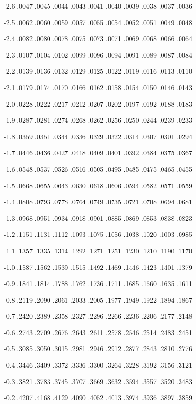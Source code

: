 \documentclass[12pt,fleqn]{article}\usepackage{../../common}
\begin{document}
-2.6 .0047 .0045 .0044 .0043 .0041 .0040 .0039 .0038 .0037 .0036

-2.5 .0062 .0060 .0059 .0057 .0055 .0054 .0052 .0051 .0049 .0048

-2.4 .0082 .0080 .0078 .0075 .0073 .0071 .0069 .0068 .0066 .0064

-2.3 .0107 .0104 .0102 .0099 .0096 .0094 .0091 .0089 .0087 .0084

-2.2 .0139 .0136 .0132 .0129 .0125 .0122 .0119 .0116 .0113 .0110

-2.1 .0179 .0174 .0170 .0166 .0162 .0158 .0154 .0150 .0146 .0143

-2.0 .0228 .0222 .0217 .0212 .0207 .0202 .0197 .0192 .0188 .0183

-1.9 .0287 .0281 .0274 .0268 .0262 .0256 .0250 .0244 .0239 .0233

-1.8 .0359 .0351 .0344 .0336 .0329 .0322 .0314 .0307 .0301 .0294

-1.7 .0446 .0436 .0427 .0418 .0409 .0401 .0392 .0384 .0375 .0367

-1.6 .0548 .0537 .0526 .0516 .0505 .0495 .0485 .0475 .0465 .0455

-1.5 .0668 .0655 .0643 .0630 .0618 .0606 .0594 .0582 .0571 .0559

-1.4 .0808 .0793 .0778 .0764 .0749 .0735 .0721 .0708 .0694 .0681

-1.3 .0968 .0951 .0934 .0918 .0901 .0885 .0869 .0853 .0838 .0823

-1.2 .1151 .1131 .1112 .1093 .1075 .1056 .1038 .1020 .1003 .0985

-1.1 .1357 .1335 .1314 .1292 .1271 .1251 .1230 .1210 .1190 .1170

-1.0 .1587 .1562 .1539 .1515 .1492 .1469 .1446 .1423 .1401 .1379

-0.9 .1841 .1814 .1788 .1762 .1736 .1711 .1685 .1660 .1635 .1611

-0.8 .2119 .2090 .2061 .2033 .2005 .1977 .1949 .1922 .1894 .1867

-0.7 .2420 .2389 .2358 .2327 .2296 .2266 .2236 .2206 .2177 .2148

-0.6 .2743 .2709 .2676 .2643 .2611 .2578 .2546 .2514 .2483 .2451

-0.5 .3085 .3050 .3015 .2981 .2946 .2912 .2877 .2843 .2810 .2776

-0.4 .3446 .3409 .3372 .3336 .3300 .3264 .3228 .3192 .3156 .3121

-0.3 .3821 .3783 .3745 .3707 .3669 .3632 .3594 .3557 .3520 .3483

-0.2 .4207 .4168 .4129 .4090 .4052 .4013 .3974 .3936 .3897 .3859
\end{document}
